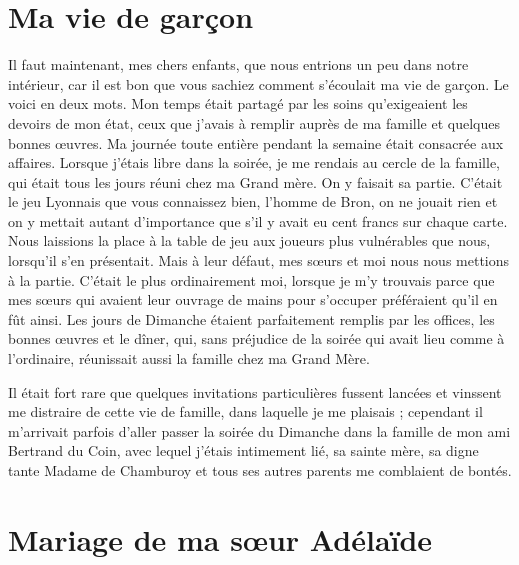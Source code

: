 \documentclass[11pt,a4paper]{report}
\begin{document}
\section*{Ma vie de garçon}

Il faut maintenant, mes chers enfants, que nous entrions un peu dans notre intérieur, car il est bon que vous sachiez comment s'écoulait ma vie de garçon. Le voici en deux mots. Mon temps était partagé par les soins qu'exigeaient les devoirs de mon état, ceux que j'avais à remplir auprès de ma famille et quelques bonnes œuvres. Ma journée toute entière pendant la semaine était consacrée aux affaires. Lorsque j'étais libre dans la soirée, je me rendais au cercle de la famille, qui était tous les jours réuni chez ma Grand mère. On y faisait sa partie. C'était le jeu Lyonnais que vous connaissez bien, l'homme de Bron, on ne jouait rien et on y mettait autant d'importance que s'il y avait eu cent francs sur chaque carte. Nous laissions la place à la table de jeu aux joueurs plus vulnérables que nous, lorsqu'il s'en présentait. Mais à leur défaut, mes sœurs et moi nous nous mettions à la partie. C'était le plus ordinairement moi, lorsque je m'y trouvais parce que mes sœurs qui avaient leur ouvrage de mains pour s'occuper préféraient qu'il en fût ainsi. Les jours de Dimanche étaient parfaitement remplis par les offices, les bonnes œuvres et le dîner, qui, sans préjudice de la soirée qui avait lieu comme à l'ordinaire, réunissait aussi la famille chez ma Grand Mère.

Il était fort rare que quelques invitations particulières fussent lancées et vinssent me distraire de cette vie de famille, dans laquelle je me plaisais ; cependant il m'arrivait parfois d'aller passer la soirée du Dimanche dans la famille de mon ami Bertrand du Coin, avec lequel j'étais intimement lié, sa sainte mère, sa digne tante Madame de Chamburoy et tous ses autres parents me comblaient de bontés.

\section*{Mariage de ma sœur Adélaïde}
\end{document}
